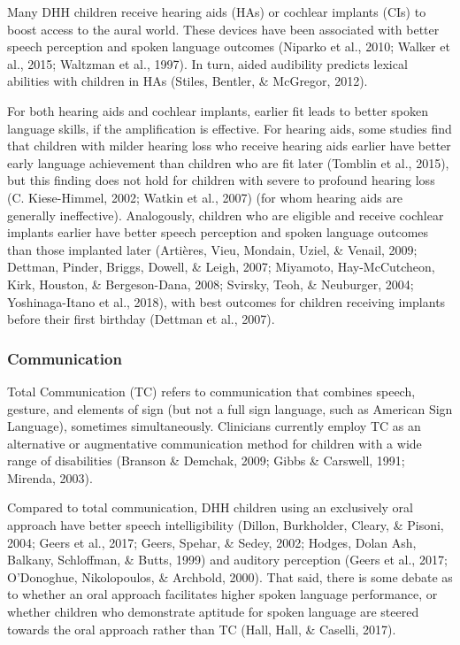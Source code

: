 \documentclass[english,man]{apa6}
\begin{document}
Many DHH children receive hearing aids (HAs) or cochlear implants (CIs) to boost access to the aural world. These devices have been associated with better speech perception and spoken language outcomes (Niparko et al., 2010; Walker et al., 2015; Waltzman et al., 1997). In turn, aided audibility predicts lexical abilities with children in HAs (Stiles, Bentler, \& McGregor, 2012).

For both hearing aids and cochlear implants, earlier fit leads to better spoken language skills, if the amplification is effective. For hearing aids, some studies find that children with milder hearing loss who receive hearing aids earlier have better early language achievement than children who are fit later (Tomblin et al., 2015), but this finding does not hold for children with severe to profound hearing loss (C. Kiese-Himmel, 2002; Watkin et al., 2007) (for whom hearing aids are generally ineffective). Analogously, children who are eligible and receive cochlear implants earlier have better speech perception and spoken language outcomes than those implanted later (Artières, Vieu, Mondain, Uziel, \& Venail, 2009; Dettman, Pinder, Briggs, Dowell, \& Leigh, 2007; Miyamoto, Hay-McCutcheon, Kirk, Houston, \& Bergeson-Dana, 2008; Svirsky, Teoh, \& Neuburger, 2004; Yoshinaga-Itano et al., 2018), with best outcomes for children receiving implants before their first birthday (Dettman et al., 2007).

\hypertarget{communication}{%
\subsubsection{Communication}\label{communication}}

Total Communication (TC) refers to communication that combines speech, gesture, and elements of sign (but not a full sign language, such as American Sign Language), sometimes simultaneously. Clinicians currently employ TC as an alternative or augmentative communication method for children with a wide range of disabilities (Branson \& Demchak, 2009; Gibbs \& Carswell, 1991; Mirenda, 2003).

Compared to total communication, DHH children using an exclusively oral approach have better speech intelligibility (Dillon, Burkholder, Cleary, \& Pisoni, 2004; Geers et al., 2017; Geers, Spehar, \& Sedey, 2002; Hodges, Dolan Ash, Balkany, Schloffman, \& Butts, 1999) and auditory perception (Geers et al., 2017; O'Donoghue, Nikolopoulos, \& Archbold, 2000). That said, there is some debate as to whether an oral approach facilitates higher spoken language performance, or whether children who demonstrate aptitude for spoken language are steered towards the oral approach rather than TC (Hall, Hall, \& Caselli, 2017).
\end{document}
